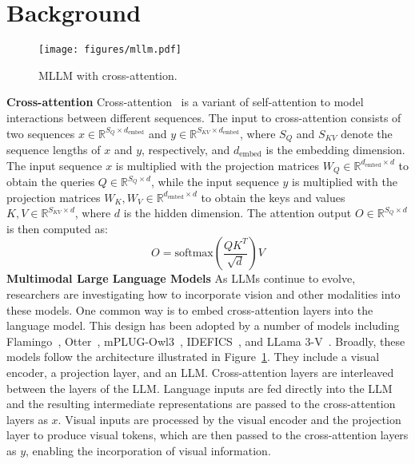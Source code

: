\section{Background}
\label{sec:background}
\begin{figure}[t]
    \centering
    \texttt{[image: figures/mllm.pdf]}
    \caption{MLLM with cross-attention.}
    \label{fig:mllm-architecture}
\end{figure}
\textbf{Cross-attention} Cross-attention~\cite{vaswani2017attention} is a variant of self-attention to model interactions between different sequences. The input to cross-attention consists of two sequences $x \in \mathbb{R}^{S_Q \times d_{\text{embed}}}$ and $y \in \mathbb{R}^{S_{KV} \times d_{\text{embed}}}$, where $S_Q$ and $S_{KV}$ denote the sequence lengths of $x$ and $y$, respectively, and $d_{\text{embed}}$ is the embedding dimension. The input sequence $x$ is multiplied with the projection matrices $W_Q\in \mathbb{R}^{d_{\text{embed}} \times d}$ to obtain the queries $Q\in \mathbb{R}^{S_Q \times d}$, while the input sequence $y$ is multiplied with the projection matrices $W_{K}, W_{V}\in \mathbb{R}^{d_{\text{embed}} \times d}$ to obtain the keys and values $K, V\in \mathbb{R}^{S_{KV} \times d}$, where $d$ is the hidden dimension. The attention output $O \in \mathbb{R}^{S_Q \times d}$ is then computed as:
\begin{equation*}
\label{eqn:attn}
    O = \text{softmax}(\frac{QK^T}{\sqrt{d}})V
\end{equation*}
\textbf{Multimodal Large Language Models} As LLMs continue to evolve, researchers are investigating how to incorporate vision and other modalities into these models. One common way is to embed cross-attention layers into the language model. This design has been adopted by a number of models including Flamingo~\cite{alayrac2022flamingo}, Otter~\cite{li2023otter}, mPLUG-Owl3~\cite{ye2024mplugowl3}, IDEFICS~\cite{laurencon2023idefics}, and LLama 3-V~\cite{grattafiori2024llama3v}. Broadly, these models follow the architecture illustrated in Figure~\ref{fig:mllm-architecture}. They include a visual encoder, a projection layer, and an LLM. Cross-attention layers are interleaved between the layers of the LLM. Language inputs are fed directly into the LLM and the resulting intermediate representations are passed to the cross-attention layers as $x$. Visual inputs are processed by the visual encoder and the projection layer to produce visual tokens, which are then passed to the cross-attention layers as $y$, enabling the incorporation of visual information.

